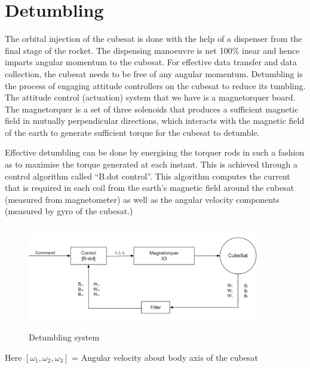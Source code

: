 \chapter{Detumbling}

The orbital injection of the cubesat is done with the help of a dispenser  from the final stage of the rocket. The dispensing manoeuvre is net 100\% inear and hence imparts angular momentum to the cubesat. For effective data transfer and data collection, the cubesat needs to be free of any angular momentum. Detumbling is the process of engaging attitude controllers on the cubesat to reduce its tumbling. The attitude control (actuation) system that we have is a magnetorquer board. The magnetorquer is a set of three solenoids that produces a sufficient magnetic field in mutually perpendicular directions, which interacts with the magnetic field of the earth to generate sufficient torque for the cubesat to detumble.

\vspace{15pt}

Effective detumbling can be done by energising the torquer rods in such a fashion as to maximise the torque generated at each instant. This is achieved through a control algorithm called “B.dot control”. This algorithm computes the current that is required in each coil from the earth’s magnetic field around the cubesat (measured from magnetometer) as well as the angular velocity components (measured by gyro of the cubesat.)

\vspace{25pt}

\begin{figure}[h!]
	\centering
	\includegraphics[width=4in,height=1.8in]{./images/flowChart}
	\caption{Detumbling system}
	\label{fig-flow-chart}
\end{figure}
 
 \vspace{25pt}
 
Here $[\omega_1, \omega_2, \omega_3]$ = Angular velocity about body axis of the cubesat

